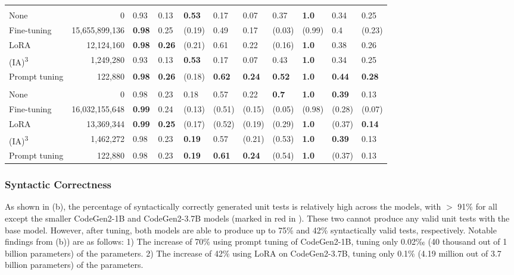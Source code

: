 \documentclass[12pt]{book}
\begin{document}
\begin{ThreePartTable}
\begin{xltabular}{\textwidth}{lr!{\color{white}\hspace{.5em}}YYYYYY!{\color{white}\hspace{1em}}YYY}
         \bigstrut \\*
        None & 0 & 0.93 & 0.13 & \textbf{0.53} & 0.17 & 0.07 & 0.37 & \textbf{1.0} & 0.34 & 0.25 \\*
        Fine-tuning & 15,655,899,136 & \textbf{0.98} & 0.25 & (0.19) & 0.49 & 0.17 & (0.03) & (0.99) & 0.4 & (0.23) \\*
        LoRA & 12,124,160 & \textbf{0.98} & \textbf{0.26} & (0.21) & 0.61 & 0.22 & (0.16) & \textbf{1.0} & 0.38 & 0.26 \\*
        (IA)\textsuperscript{3} & 1,249,280 & 0.93 & 0.13 & \textbf{0.53} & 0.17 & 0.07 & 0.43 & \textbf{1.0} & 0.34 & 0.25 \\*
        Prompt tuning & 122,880 & \textbf{0.98} & \textbf{0.26} & (0.18) & \textbf{0.62} & \textbf{0.24} & \textbf{0.52} & \textbf{1.0} & \textbf{0.44} & \textbf{0.28} \\

         \bigstrut \\*
        None & 0 & 0.98 & 0.23 & 0.18 & 0.57 & 0.22 & \textbf{0.7} & \textbf{1.0} & \textbf{0.39} & 0.13 \\*
        Fine-tuning & 16,032,155,648 & \textbf{0.99} & 0.24 & (0.13) & (0.51) & (0.15) & (0.05) & (0.98) & (0.28) & (0.07) \\*
        LoRA & 13,369,344 & \textbf{0.99} & \textbf{0.25} & (0.17) & (0.52) & (0.19) & (0.29) & \textbf{1.0} & (0.37) & \textbf{0.14} \\*
        (IA)\textsuperscript{3} & 1,462,272 & 0.98 & 0.23 & \textbf{0.19} & 0.57 & (0.21) & (0.53) & \textbf{1.0} & \textbf{0.39} & 0.13 \\*
        Prompt tuning & 122,880 & 0.98 & 0.23 & \textbf{0.19} & \textbf{0.61} & \textbf{0.24} & (0.54) & \textbf{1.0} & (0.37) & 0.13

    \end{xltabular}
\end{ThreePartTable}

\subsubsection{Syntactic Correctness}
\label{sec:syntax}
As shown in (b), the percentage of syntactically correctly generated unit tests is relatively high across the models, with $>$ 91\% for all except the smaller CodeGen2-1B and CodeGen2-3.7B models (marked in red in ). These two cannot produce any valid unit tests with the base model. However, after tuning, both models are able to produce up to 75\% and 42\% syntactically valid tests, respectively. Notable findings from (b)) are as follows: 1) The increase of 70\% using prompt tuning of CodeGen2-1B, tuning only 0.02‰ (40 thousand out of 1 billion parameters) of the parameters. 2) The increase of 42\% using LoRA on CodeGen2-3.7B, tuning only 0.1\% (4.19 million out of 3.7 billion parameters) of the parameters.
\end{document}
